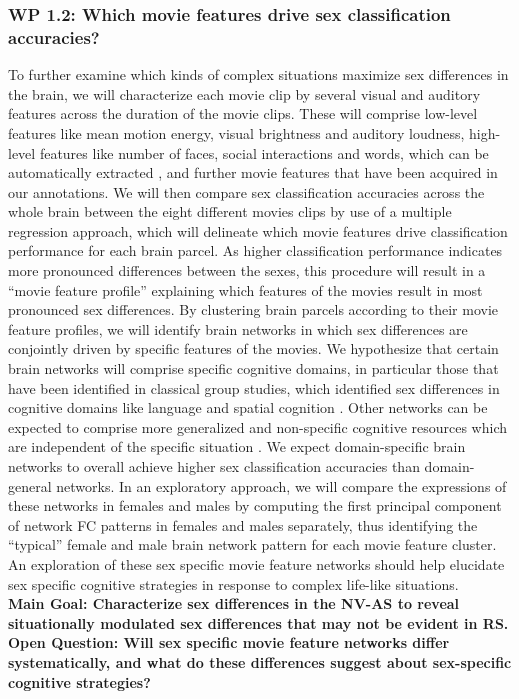 \documentclass[11pt,a4paper]{article}
\begin{document}
\subsubsection*{WP 1.2: Which movie features drive sex classification accuracies?}
To further examine which kinds of complex situations maximize sex differences in the brain, we will characterize each movie 
clip by several visual and auditory features across the duration of the movie clips. These will comprise 
low-level features like mean motion energy, visual brightness and auditory loudness, high-level features 
like number of faces, social interactions and words, 
which can be automatically extracted \parencite{mcnamaraDevelopingComprehensiveFramework2017a,radfordRobustSpeechRecognition2022}, 
and further movie features that have been acquired in our annotations. We will then compare sex classification 
accuracies across the whole brain between the eight different movies clips by use of a multiple regression approach, 
which will delineate which movie features drive classification performance for each brain parcel. 
As higher classification performance indicates more pronounced differences between the sexes, this procedure will 
result in a “movie feature profile” explaining which features of the movies result in most pronounced sex differences. 
By clustering brain parcels according to their movie feature profiles, we will identify brain networks in which sex 
differences are conjointly driven by specific features of the movies. We hypothesize that certain brain 
networks will comprise specific cognitive domains, in particular those that have been identified in 
classical group studies, which identified sex differences in cognitive domains like language and spatial 
cognition \parencite{halpernSexDifferencesCognitive2000a,kimuraSexCognition2000a}. 
Other networks can be expected to comprise more generalized and 
non-specific cognitive resources which are independent of the specific situation \parencite{hugdahlExistenceGeneralizedNonspecific2015a}. 
We expect domain-specific brain networks to overall achieve higher sex classification accuracies than 
domain-general networks. In an exploratory approach, we will compare the expressions of these networks 
in females and males by computing the first principal component of network FC patterns in females and males separately, 
thus identifying the “typical” female and male brain network pattern for each movie feature cluster. 
An exploration of these sex specific movie feature networks should help elucidate sex specific 
cognitive strategies in response to complex life-like situations.\\ 
\textbf{Main Goal: Characterize sex differences in the NV-AS to reveal situationally modulated sex differences 
that may not be evident in RS.}\\
\textbf{Open Question: Will sex specific movie feature networks differ systematically, 
and what do these differences suggest about sex-specific cognitive strategies?}
\end{document}
